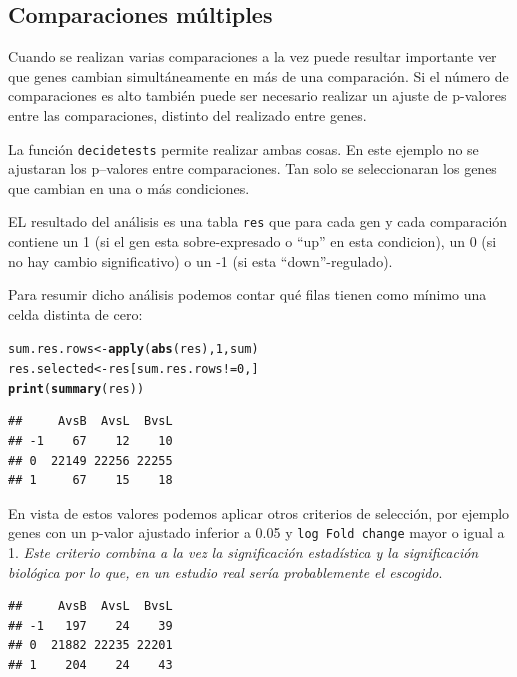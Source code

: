 \documentclass[a4paper]{article}\usepackage[]{graphicx}\usepackage[]{color}
\makeatletter
\newcommand{\hlnum}[1]{\textcolor[rgb]{0.686,0.059,0.569}{#1}}%
\newcommand{\hlopt}[1]{\textcolor[rgb]{0,0,0}{#1}}%
\newcommand{\hlstd}[1]{\textcolor[rgb]{0.345,0.345,0.345}{#1}}%
\newcommand{\hlkwb}[1]{\textcolor[rgb]{0.69,0.353,0.396}{#1}}%
\newcommand{\hlkwd}[1]{\textcolor[rgb]{0.737,0.353,0.396}{\textbf{#1}}}%
\newenvironment{kframe}{%
 \def\at@end@of@kframe{}%
 \ifinner\ifhmode%
  \def\at@end@of@kframe{\end{minipage}}%
  \begin{minipage}{\columnwidth}%
 \fi\fi%
 \def\FrameCommand##1{\hskip\@totalleftmargin \hskip-\fboxsep
 \colorbox{shadecolor}{##1}\hskip-\fboxsep
     \hskip-\linewidth \hskip-\@totalleftmargin \hskip\columnwidth}%
 \MakeFramed {\advance\hsize-\width
   \@totalleftmargin\z@ \linewidth\hsize
   \@setminipage}}%
 {\par\unskip\endMakeFramed%
 \at@end@of@kframe}
\newenvironment{knitrout}{}{} %
\makeatother
\begin{document}
\subsection{Comparaciones múltiples}

Cuando se realizan varias comparaciones a la vez puede resultar importante ver 
que genes cambian simultáneamente en más de una comparación.
Si el número de comparaciones es alto también puede ser necesario realizar un 
ajuste de p-valores entre las comparaciones, distinto del realizado entre genes.

La función \texttt{decidetests} permite realizar ambas cosas.
En este ejemplo no se ajustaran los p--valores entre comparaciones. Tan solo se seleccionaran los genes que cambian en una o más condiciones.

EL resultado del análisis es una tabla \texttt{res} que para cada gen y cada comparación 
contiene un 1 (si el gen esta sobre-expresado o ``up'' en esta condicion), 
un 0 (si no hay cambio significativo) o un -1 
(si esta ``down''-regulado).



Para resumir dicho análisis podemos contar qué filas tienen como mínimo una celda distinta de cero:

\begin{knitrout}
\color{fgcolor}\begin{kframe}
\begin{alltt}
\hlstd{sum.res.rows}\hlkwb{<-}\hlkwd{apply}\hlstd{(}\hlkwd{abs}\hlstd{(res),}\hlnum{1}\hlstd{,sum)}
\hlstd{res.selected}\hlkwb{<-}\hlstd{res[sum.res.rows}\hlopt{!=}\hlnum{0}\hlstd{,]}
\hlkwd{print}\hlstd{(}\hlkwd{summary}\hlstd{(res))}
\end{alltt}
\begin{verbatim}
##     AvsB  AvsL  BvsL
## -1    67    12    10
## 0  22149 22256 22255
## 1     67    15    18
\end{verbatim}
\end{kframe}
\end{knitrout}

En vista de estos valores podemos aplicar otros criterios de selección, por ejemplo genes con un p-valor ajustado inferior a 0.05 y \texttt{log Fold change} mayor o igual a 1.\emph{ Este criterio combina a la vez la significación estadística y la significación biológica por lo que, en un estudio real sería probablemente el escogido}.

\begin{knitrout}
\color{fgcolor}\begin{kframe}
\begin{verbatim}
##     AvsB  AvsL  BvsL
## -1   197    24    39
## 0  21882 22235 22201
## 1    204    24    43
\end{verbatim}
\end{kframe}
\end{knitrout}
\end{document}
